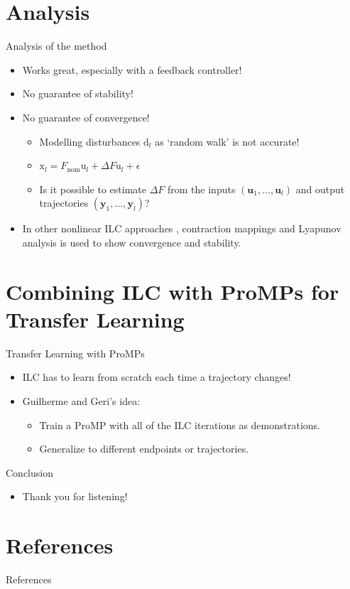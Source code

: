 \documentclass{beamer}
\newcommand{\sysInput}{\mathbf{u}} %
\newcommand{\observations}{\mathbf{y}} %
\newcommand{\liftedinput}{\mathrm{u}}
\newcommand{\liftedstate}{\mathrm{x}}
\newcommand{\disturbance}{\mathrm{d}}
\begin{document}
\section{Analysis}
%
\begin{frame}{Analysis of the method}
\begin{itemize}
\item Works great, especially with a feedback controller! \pause
\item No guarantee of stability! \pause
\item No guarantee of convergence! \pause
	\begin{itemize}
	\item Modelling disturbances $\disturbance_l$ as `random walk' is not accurate! \pause
	\item $\liftedstate_l = F_{\mathrm{nom}}\liftedinput_l + \Delta F \liftedinput_l + \epsilon$ \pause
	\item Is it possible to estimate $\Delta F$ from the inputs $(\sysInput_1, \ldots, \sysInput_l)$ and output trajectories $(\observations_1, \ldots, \observations_l)$? \pause
	\end{itemize}
\item In other nonlinear ILC approaches \cite{Xu}, contraction mappings and Lyapunov analysis is used to show convergence and stability.
\end{itemize}
\end{frame}
%
%
%
\section{Combining ILC with ProMPs for Transfer Learning}
%
\begin{frame}{Transfer Learning with ProMPs}
\begin{itemize}
\item ILC has to learn from scratch each time a trajectory changes! \pause
\item Guilherme and Geri's idea: \pause
\begin{itemize}
\item Train a ProMP with all of the ILC iterations as demonstrations. \pause
\item Generalize to different endpoints or trajectories.
\end{itemize}
\end{itemize}
\end{frame}	
%
\begin{frame}{Conclusion}
\begin{itemize}
\item Thank you for listening!
\end{itemize}
\end{frame}	
%
\section{References}
\begin{frame}[allowframebreaks]{References}
\def\newblock{\hskip .11em plus .33em minus .07em}

\end{frame}
%

%
\end{document}
